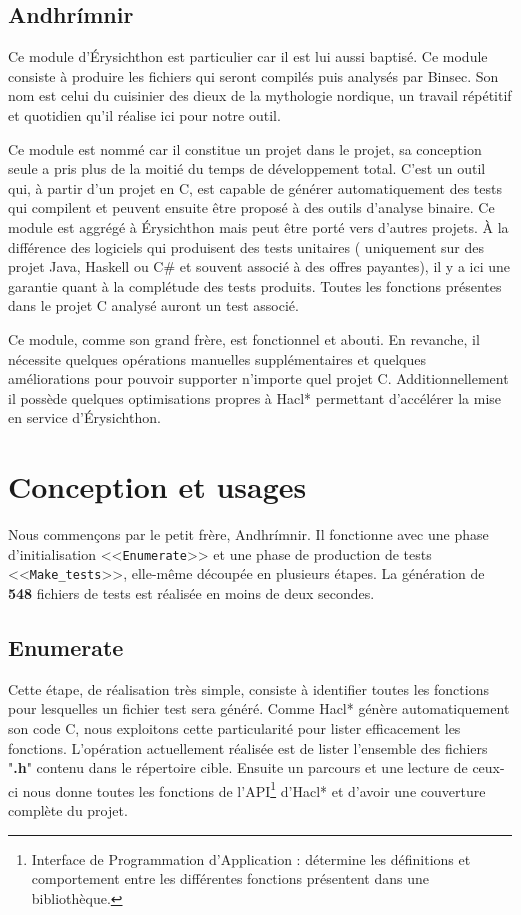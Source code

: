 \subsection*{Andhrímnir}

Ce module d'Érysichthon est particulier car il est lui aussi baptisé. Ce module consiste à produire les fichiers qui seront compilés puis analysés par Binsec. Son nom est celui du cuisinier des dieux de la mythologie nordique, un travail répétitif et quotidien qu'il réalise ici pour notre outil.\smallbreak

Ce module est nommé car il constitue un projet dans le projet, sa conception seule a pris plus de la moitié du temps de développement total. C'est un outil qui, à partir d'un projet en C, est capable de générer automatiquement des tests qui compilent et peuvent ensuite être proposé à des outils d'analyse binaire. Ce module est aggrégé à Érysichthon mais peut être porté vers d'autres projets. À la différence des logiciels qui produisent des tests unitaires ( uniquement sur des projet Java, Haskell ou C\# et souvent associé à des offres payantes), il y a ici une garantie quant à la complétude des tests produits. Toutes les fonctions présentes dans le projet C analysé auront un test associé.\smallbreak

Ce module, comme son grand frère, est fonctionnel et abouti. En revanche, il nécessite quelques opérations manuelles supplémentaires et quelques améliorations pour pouvoir supporter n'importe quel projet C. Additionnellement il possède quelques optimisations propres à Hacl* permettant d'accélérer la mise en service d'Érysichthon.

\section{Conception et usages}

Nous commençons par le petit frère, Andhrímnir. Il fonctionne avec une phase d'initialisation <<\texttt{Enumerate}>> et une phase de production de tests <<\texttt{Make\_tests}>>, elle-même découpée en plusieurs étapes. La génération de \textbf{548} fichiers de tests est réalisée en moins de deux secondes.\smallbreak

\subsection*{Enumerate}

Cette étape, de réalisation très simple, consiste à identifier toutes les fonctions pour lesquelles un fichier test sera généré. Comme Hacl* génère automatiquement son code C, nous exploitons cette particularité pour lister efficacement les fonctions. L'opération actuellement réalisée est de lister l'ensemble des fichiers "\textbf{.h}" contenu dans le répertoire cible. Ensuite un parcours et une lecture de ceux-ci nous donne toutes les fonctions de l'API\footnote{Interface de Programmation d'Application : détermine les définitions et comportement entre les différentes fonctions présentent dans une bibliothèque.} d'Hacl* et d'avoir une couverture complète du projet.\smallbreak

